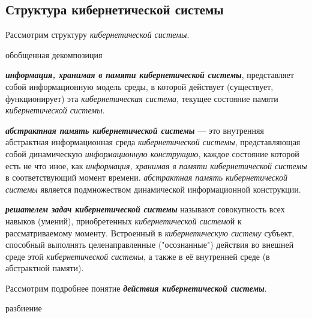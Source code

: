 \subsection{Структура кибернетической системы}
{\label{sec_cyb_syst_structure}} 

Рассмотрим структуру \textit{кибернетической системы}.
\begin{SCn}
	\begin{scnrelfromset}{обобщенная декомпозиция}
	\end{scnrelfromset}
\end{SCn}

\textbf{\textit{информация, хранимая в памяти \textit{кибернетической системы}}}, представляет собой информационную модель среды, в которой действует (существует, функционирует) эта \textit{кибернетическая система}, текущее состояние памяти \textit{кибернетической системы}.

\textbf{\textit{абстрактная память кибернетической системы}} --- это внутренняя абстрактная информационная среда \textit{кибернетической системы}, представляющая собой динамическую \textit{информационную конструкцию}, каждое состояние которой есть не что иное, как \textit{информация, хранимая в памяти кибернетической системы} в соответствующий момент времени. \textit{абстрактная память кибернетической системы} является подмножеством динамической информационной конструкции.

\textbf{\textit{решателем задач кибернетической системы}} называют совокупность всех навыков (умений), приобретенных \textit{кибернетической системо}й к рассматриваемому моменту. Встроенный в \textit{кибернетическую систему} субъект, способный выполнять целенаправленные ("осознанные") действия во внешней среде этой \textit{кибернетической системы}, а также в её внутренней среде (в абстрактной памяти).

Рассмотрим подробнее понятие \textbf{\textit{действия кибернетической системы}}.

\begin{SCn}
\begin{scnrelfromset}{разбиение}
	\begin{scnindent}
	\end{scnindent}

\end{scnrelfromset}
\end{SCn}

